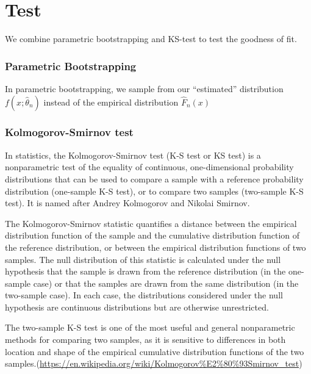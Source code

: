 \documentclass[]{article}
\begin{document}
\hypertarget{test}{%
\section{Test}\label{test}}

We combine parametric bootstrapping and KS-test to test the goodness of
fit.

\hypertarget{parametric-bootstrapping}{%
\subsubsection{Parametric
Bootstrapping}\label{parametric-bootstrapping}}

In parametric bootstrapping, we sample from our ``estimated''
distribution \(f(x; \hat{\theta}_n)\) instead of the empirical
distribution \(\hat{F}_n(x)\)

\hypertarget{kolmogorov-smirnov-test}{%
\subsubsection{Kolmogorov-Smirnov test}\label{kolmogorov-smirnov-test}}

In statistics, the Kolmogorov-Smirnov test (K-S test or KS test) is a
nonparametric test of the equality of continuous, one-dimensional
probability distributions that can be used to compare a sample with a
reference probability distribution (one-sample K-S test), or to compare
two samples (two-sample K-S test). It is named after Andrey Kolmogorov
and Nikolai Smirnov.

The Kolmogorov-Smirnov statistic quantifies a distance between the
empirical distribution function of the sample and the cumulative
distribution function of the reference distribution, or between the
empirical distribution functions of two samples. The null distribution
of this statistic is calculated under the null hypothesis that the
sample is drawn from the reference distribution (in the one-sample case)
or that the samples are drawn from the same distribution (in the
two-sample case). In each case, the distributions considered under the
null hypothesis are continuous distributions but are otherwise
unrestricted.

The two-sample K-S test is one of the most useful and general
nonparametric methods for comparing two samples, as it is sensitive to
differences in both location and shape of the empirical cumulative
distribution functions of the two
samples.(\url{https://en.wikipedia.org/wiki/Kolmogorov\%E2\%80\%93Smirnov_test})
\end{document}
